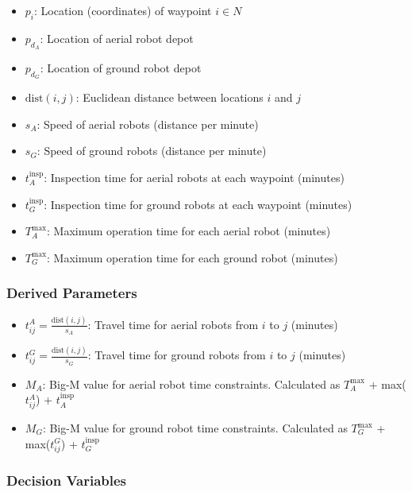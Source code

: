 \documentclass{article}
\begin{document}
				\begin{itemize}
				\item $p_i$: Location (coordinates) of waypoint $i \in N$
				\item $p_{d_A}$: Location of aerial robot depot
				\item $p_{d_G}$: Location of ground robot depot
				\item $\text{dist}(i,j)$: Euclidean distance between locations $i$ and $j$
				\item $s_A$: Speed of aerial robots (distance per minute)
				\item $s_G$: Speed of ground robots (distance per minute)
				\item $t_A^{\text{insp}}$: Inspection time for aerial robots at each waypoint (minutes)
				\item $t_G^{\text{insp}}$: Inspection time for ground robots at each waypoint (minutes)
				\item $T_A^{\max}$: Maximum operation time for each aerial robot (minutes)
				\item $T_G^{\max}$: Maximum operation time for each ground robot (minutes)
				\end{itemize}

			\subsubsection{Derived Parameters}

				\begin{itemize}
				\item $t_{ij}^{A} = \frac{\text{dist}(i,j)}{s_A}$: Travel time for aerial robots from $i$ to $j$ (minutes)
				\item $t_{ij}^{G} = \frac{\text{dist}(i,j)}{s_G}$: Travel time for ground robots from $i$ to $j$ (minutes)
				\item $M_A$: Big-M value for aerial robot time constraints. Calculated as $T_A^{\max}$ + max($t_{ij}^{A}$) + $t_A^{\text{insp}}$
				\item $M_G$: Big-M value for ground robot time constraints.  Calculated as $T_G^{\max}$ + max($t_{ij}^{G}$) + $t_G^{\text{insp}}$
				\end{itemize}

			\subsubsection{Decision Variables}
\end{document}
